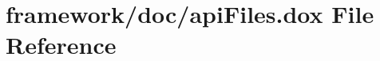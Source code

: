 \hypertarget{api_files_8dox}{}\section{framework/doc/api\+Files.dox File Reference}
\label{api_files_8dox}
